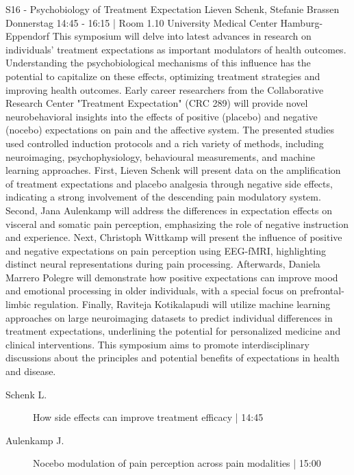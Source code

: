 
            \begin{symposium}
            {S16 - Psychobiology of Treatment Expectation }
            { Lieven Schenk, Stefanie Brassen}
            {Donnerstag 14:45 - 16:15 | Room 1.10}
            {University Medical Center Hamburg-Eppendorf}
            This symposium will delve into latest advances in research on individuals’ treatment expectations as important modulators of health outcomes. Understanding the psychobiological mechanisms of this influence has the potential to capitalize on these effects, optimizing treatment strategies and improving health outcomes. Early career researchers from the Collaborative Research Center "Treatment Expectation" (CRC 289) will provide novel neurobehavioral insights into the effects of positive (placebo) and negative (nocebo) expectations on pain and the affective system. The presented studies used controlled induction protocols and a rich variety of methods, including neuroimaging, psychophysiology, behavioural measurements, and machine learning approaches.
First, Lieven Schenk will present data on the amplification of treatment expectations and placebo analgesia through negative side effects, indicating a strong involvement of the descending pain modulatory system. Second, Jana Aulenkamp will address the differences in expectation effects on visceral and somatic pain perception, emphasizing the role of negative instruction and experience. Next, Christoph Wittkamp will present the influence of positive and negative expectations on pain perception using EEG-fMRI, highlighting distinct neural representations during pain processing. Afterwards, Daniela Marrero Polegre will demonstrate how positive expectations can improve mood and emotional processing in older individuals, with a special focus on prefrontal-limbic regulation. Finally, Raviteja Kotikalapudi will utilize machine learning approaches on large neuroimaging datasets to predict individual differences in treatment expectations, underlining the potential for personalized medicine and clinical interventions.
This symposium aims to promote interdisciplinary discussions about the principles and potential benefits of expectations in health and disease.
            \begin{description}    
            
                \item [ Schenk L.] How side effects can improve treatment efficacy \textcolor{mygray}{ | 14:45}    
                
                \item [ Aulenkamp J.] Nocebo modulation of pain perception across pain modalities \textcolor{mygray}{ | 15:00}    
                

\end{description}
\end{symposium}
